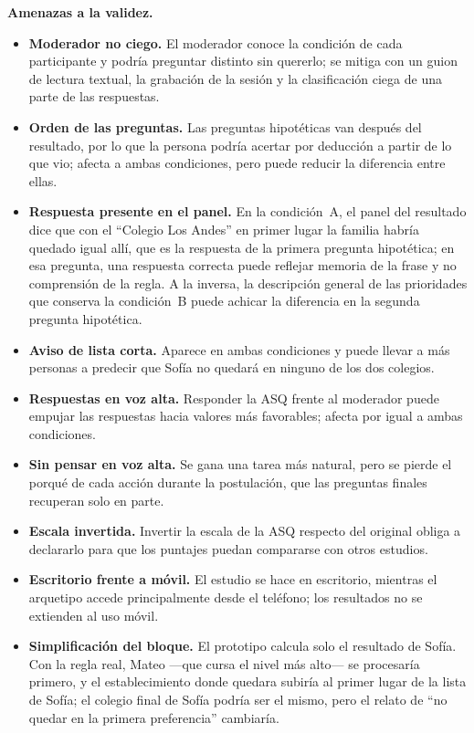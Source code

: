 \textbf{Amenazas a la validez.}
\begin{itemize}
    \item \textbf{Moderador no ciego.} El moderador conoce la condición de cada participante y podría preguntar distinto sin quererlo; se mitiga con un guion de lectura textual, la grabación de la sesión y la clasificación ciega de una parte de las respuestas.
    \item \textbf{Orden de las preguntas.} Las preguntas hipotéticas van después del resultado, por lo que la persona podría acertar por deducción a partir de lo que vio; afecta a ambas condiciones, pero puede reducir la diferencia entre ellas.
    \item \textbf{Respuesta presente en el panel.} En la condición~A, el panel del resultado dice que con el ``Colegio Los Andes'' en primer lugar la familia habría quedado igual allí, que es la respuesta de la primera pregunta hipotética; en esa pregunta, una respuesta correcta puede reflejar memoria de la frase y no comprensión de la regla. A la inversa, la descripción general de las prioridades que conserva la condición~B puede achicar la diferencia en la segunda pregunta hipotética.
    \item \textbf{Aviso de lista corta.} Aparece en ambas condiciones y puede llevar a más personas a predecir que Sofía no quedará en ninguno de los dos colegios.
    \item \textbf{Respuestas en voz alta.} Responder la ASQ frente al moderador puede empujar las respuestas hacia valores más favorables; afecta por igual a ambas condiciones.
    \item \textbf{Sin pensar en voz alta.} Se gana una tarea más natural, pero se pierde el porqué de cada acción durante la postulación, que las preguntas finales recuperan solo en parte.
    \item \textbf{Escala invertida.} Invertir la escala de la ASQ respecto del original obliga a declararlo para que los puntajes puedan compararse con otros estudios.
    \item \textbf{Escritorio frente a móvil.} El estudio se hace en escritorio, mientras el arquetipo accede principalmente desde el teléfono; los resultados no se extienden al uso móvil.
    \item \textbf{Simplificación del bloque.} El prototipo calcula solo el resultado de Sofía. Con la regla real, Mateo ---que cursa el nivel más alto--- se procesaría primero, y el establecimiento donde quedara subiría al primer lugar de la lista de Sofía; el colegio final de Sofía podría ser el mismo, pero el relato de ``no quedar en la primera preferencia'' cambiaría.

\end{itemize}
